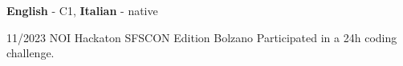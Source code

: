 \documentclass[9pt]{developercv} %
\begin{document}

\vspace{-10 pt}
    \vspace{-6pt}
    
    \hspace{26mm} \textbf{English} - C1, 
    \textbf{ Italian} - native

\vspace{-10 pt}
\begin{entrylist}

	\entry
	{11/2023}
	{NOI Hackaton SFSCON Edition}
	{Bolzano}
	{Participated in a 24h coding challenge.}

\end{entrylist}
\end{document}
